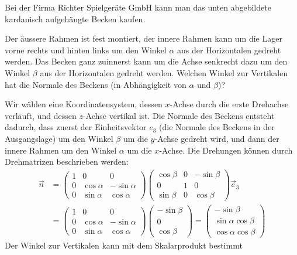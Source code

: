 Bei der Firma Richter Spielgeräte GmbH kann man das unten abgebildete
kardanisch aufgehängte Becken kaufen. 
\begin{center}
\end{center}
Der äussere Rahmen ist fest montiert, der innere Rahmen kann um
die Lager vorne rechts und hinten links um den Winkel $\alpha$
aus der Horizontalen
gedreht werden. Das Becken ganz zuinnerst kann um die Achse
senkrecht dazu um den Winkel $\beta$ aus der Horizontalen gedreht werden.
Welchen
Winkel zur Vertikalen hat die Normale des Beckens (in Abhängigkeit
von $\alpha$ und $\beta$)?

\begin{loesung}
Wir wählen eine Koordinatensystem, dessen $x$-Achse durch die
erste Drehachse verläuft, und dessen $z$-Achse vertikal ist.
Die Normale des Beckens entsteht dadurch, dass zuerst der
Einheitsvektor $e_3$ (die Normale des Beckens in der Ausgangslage)
um den Winkel $\beta$ um die $y$-Achse gedreht wird,
und dann der innere Rahmen um den Winkel $\alpha$ um die
$x$-Achse. Die Drehungen können durch Drehmatrizen beschrieben werden:
\begin{align*}
\vec n
&=
\begin{pmatrix}
1&0&0\\
0&\cos\alpha&-\sin\alpha\\
0&\sin\alpha& \cos\alpha
\end{pmatrix}
\begin{pmatrix}
\cos\beta&0&-\sin\beta\\
0&1&0\\
\sin\beta&0&\cos\beta
\end{pmatrix}\vec e_3
\\
&=
\begin{pmatrix}
1&0&0\\
0&\cos\alpha&-\sin\alpha\\
0&\sin\alpha& \cos\alpha
\end{pmatrix}
\begin{pmatrix}
-\sin\beta\\
0\\
\cos\beta
\end{pmatrix}
=
\begin{pmatrix}
-\sin\beta\\
\sin\alpha\cos\beta\\
\cos\alpha\cos\beta
\end{pmatrix}
\end{align*}
Der Winkel zur Vertikalen kann mit dem Skalarprodukt bestimmt

\end{loesung}
